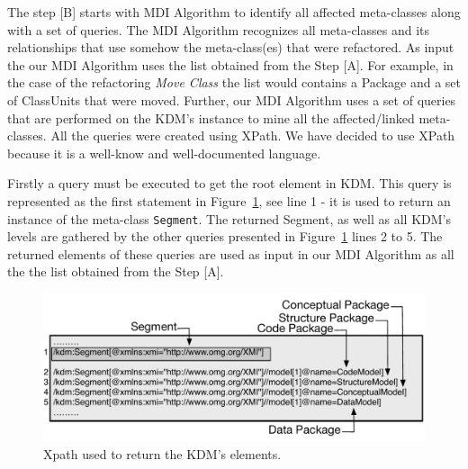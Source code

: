 The step [B] starts with MDI Algorithm to identify all affected meta-classes along with a set of queries. The MDI Algorithm recognizes all meta-classes and its relationships that use somehow the meta-class(es) that were refactored. As input the our MDI Algorithm uses the list obtained from the Step [A]. For example, in the case of the refactoring \textit{Move Class} the list would contains a Package and a set of ClassUnits that were moved. Further, our MDI Algorithm uses a set of queries that are performed on the KDM's instance to mine all the affected/linked meta-classes. All the queries were created using XPath. We have decided to use XPath because it is a well-know and well-documented language. 


Firstly a query must be executed to get the root element in KDM. This query is represented as the first statement in Figure~\ref{fig:queriesXPath}, see line 1 - it is used to return an instance of the meta-class \texttt{Segment}. The returned Segment, as well as all KDM's levels are gathered by the other queries presented in Figure~\ref{fig:queriesXPath} lines 2 to 5. The returned elements of these queries are used as input in our MDI Algorithm as all the the list obtained from the Step [A].

\begin{figure}[h]
	\centering
	\includegraphics[scale=0.479]{figuras/queiresANDATLSBESNew}
	\caption{Xpath used to return the KDM's elements.}
	\label{fig:queriesXPath}
\end{figure}


